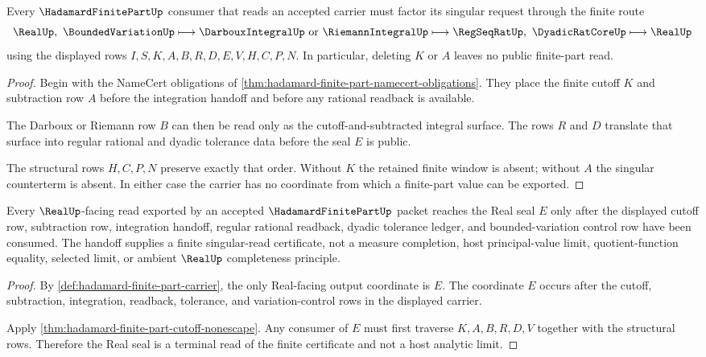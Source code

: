 \begin{theorem}
\label{thm:hadamard-finite-part-cutoff-nonescape}
Every $\HadamardFinitePartUp$ consumer that reads an accepted carrier must factor its singular request through the finite route
$$
\RealUp,\ \BoundedVariationUp
\longmapsto
\DarbouxIntegralUp\ \hbox{or}\ \RiemannIntegralUp
\longmapsto
\RegSeqRatUp,\ \DyadicRatCoreUp
\longmapsto
\RealUp
$$
using the displayed rows $I,S,K,A,B,R,D,E,V,H,C,P,N$. In particular, deleting $K$ or $A$ leaves no public finite-part read.
\end{theorem}
\begin{proof}
Begin with the NameCert obligations of \autoref{thm:hadamard-finite-part-namecert-obligations}. They place the finite cutoff $K$ and subtraction row $A$ before the integration handoff and before any rational readback is available.

The Darboux or Riemann row $B$ can then be read only as the cutoff-and-subtracted integral surface. The rows $R$ and $D$ translate that surface into regular rational and dyadic tolerance data before the seal $E$ is public.

The structural rows $H,C,P,N$ preserve exactly that order. Without $K$ the retained finite window is absent; without $A$ the singular counterterm is absent. In either case the carrier has no coordinate from which a finite-part value can be exported.
\end{proof}

\begin{theorem}
\label{thm:hadamard-finite-part-real-seal-handoff}
Every $\RealUp$-facing read exported by an accepted $\HadamardFinitePartUp$ packet reaches the Real seal $E$ only after the displayed cutoff row, subtraction row, integration handoff, regular rational readback, dyadic tolerance ledger, and bounded-variation control row have been consumed. The handoff supplies a finite singular-read certificate, not a measure completion, host principal-value limit, quotient-function equality, selected limit, or ambient $\RealUp$ completeness principle.
\end{theorem}
\begin{proof}
By \autoref{def:hadamard-finite-part-carrier}, the only Real-facing output coordinate is $E$. The coordinate $E$ occurs after the cutoff, subtraction, integration, readback, tolerance, and variation-control rows in the displayed carrier.

Apply \autoref{thm:hadamard-finite-part-cutoff-nonescape}. Any consumer of $E$ must first traverse $K,A,B,R,D,V$ together with the structural rows. Therefore the Real seal is a terminal read of the finite certificate and not a host analytic limit.
\end{proof}

